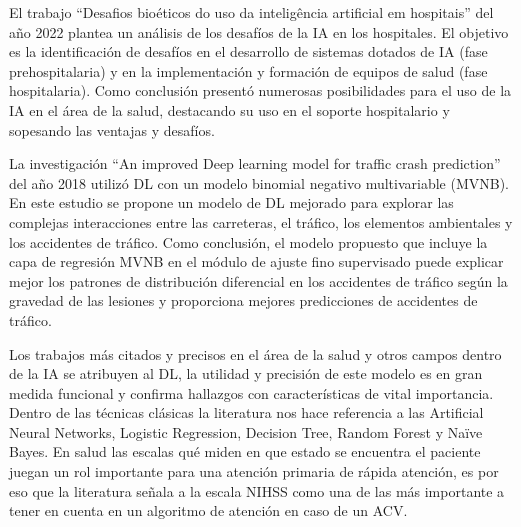 \par El trabajo “Desafios bioéticos do uso da inteligência artificial em hospitais” del año 2022 \cite{Bioetica2022} plantea un análisis de los desafíos de la IA en los hospitales. El objetivo es la identificación de desafíos en el desarrollo de sistemas dotados de IA (fase prehospitalaria) y en la implementación y formación de equipos de salud (fase hospitalaria). Como conclusión presentó numerosas posibilidades para el uso de la IA en el área de la salud, destacando su uso en el soporte hospitalario y sopesando las ventajas y desafíos.\\

\par La investigación “An improved Deep learning model for traffic crash prediction” del año 2018 \cite{shao2018improved} utilizó DL con un modelo binomial negativo multivariable (MVNB). En este estudio se propone un modelo de DL mejorado para explorar las complejas interacciones entre las carreteras, el tráfico, los elementos ambientales y los accidentes de tráfico. Como conclusión, el modelo propuesto que incluye la capa de regresión MVNB en el módulo de ajuste fino supervisado puede explicar mejor los patrones de distribución diferencial en los accidentes de tráfico según la gravedad de las lesiones y proporciona mejores predicciones de accidentes de tráfico.\\

\par Los trabajos más citados y precisos en el área de la salud y otros campos dentro de la IA se atribuyen al DL, la utilidad y precisión de este modelo es en gran medida funcional y confirma hallazgos con características de vital importancia. Dentro de las técnicas clásicas la literatura nos hace referencia a las Artificial Neural Networks, Logistic Regression, Decision Tree, Random Forest y Naïve Bayes. En salud las escalas qué miden en que estado se encuentra el paciente juegan un rol importante para una atención primaria de rápida atención, es por eso que la literatura señala a la escala NIHSS como una de las más importante a tener en cuenta en un algoritmo de atención en caso de un ACV.\\

